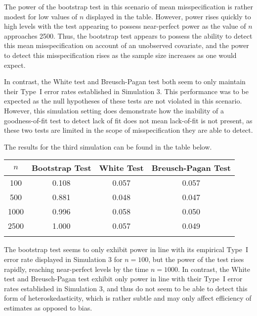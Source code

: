 \documentclass[12pt]{article} %
\theoremstyle{definition}
\begin{document}
The power of the bootstrap test in this scenario of mean misspecification is rather modest for low values of $n$ displayed in the table. However, power rises quickly to high levels
with the test appearing to possess near-perfect power as the value of $n$ approaches 2500. Thus, the bootstrap test appears to possess the ability to detect this mean
misspecification on account of an unobserved covariate, and the power to detect this misspecification rises as the sample size increases as one would expect.

In contrast, the White test and Breusch-Pagan test both seem to only maintain their Type~I error rates established in Simulation 3. This performance was to be expected
as the null hypotheses of these tests are not violated in this scenario. However, this simulation setting does demonstrate how the inability of a goodness-of-fit test to detect lack of
fit does not mean lack-of-fit is not present, as these two tests are limited in the scope of misspecification they are able to detect.

The results for the third simulation can be found in the table below.

\begin{table}[H]
	\centering
	\small\addtolength{\tabcolsep}{-3pt}
	\setlength\extrarowheight{-3pt}
	{
	\begin{tabular}{ c|c|c|c}
	$n$ & Bootstrap Test & White Test & Breusch-Pagan Test \\
	 \hline
	 100 & 0.108 & 0.057 & 0.057 \\
	 500 & 0.881 & 0.048 & 0.047 \\
	 1000 & 0.996 & 0.058 & 0.050 \\
	 2500 & 1.000 & 0.057 & 0.049 \\
	 \Xhline{3\arrayrulewidth}
	\end{tabular}
	}
\end{table}

The bootstrap test seems to only exhibit power in line with its empirical Type~I error rate displayed in Simulation 3 for $n = 100$, but the power of the test rises
rapidly, reaching near-perfect levels by the time $n = 1000$. In contrast, the White test and Breusch-Pagan test exhibit only power in line with their Type~I error
rates established in Simulation 3, and thus do not seem to be able to detect this form of heteroskedasticity, which is rather subtle and may only affect efficiency
of estimates as opposed to bias.
\end{document}
